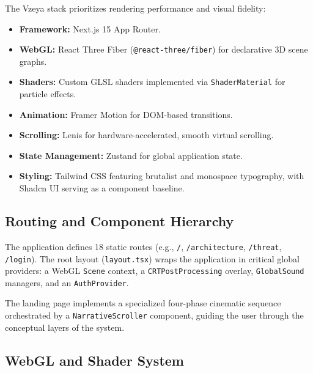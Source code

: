 The Vzeya stack prioritizes rendering performance and visual fidelity:
\begin{itemize}
    \item \textbf{Framework:} Next.js 15 App Router.
    \item \textbf{WebGL:} React Three Fiber (\texttt{@react-three/fiber}) for declarative 3D scene graphs.
    \item \textbf{Shaders:} Custom GLSL shaders implemented via \texttt{ShaderMaterial} for particle effects.
    \item \textbf{Animation:} Framer Motion for DOM-based transitions.
    \item \textbf{Scrolling:} Lenis for hardware-accelerated, smooth virtual scrolling.
    \item \textbf{State Management:} Zustand for global application state.
    \item \textbf{Styling:} Tailwind CSS featuring brutalist and monospace typography, with Shadcn UI serving as a component baseline.
\end{itemize}

\subsection{Routing and Component Hierarchy}
\label{sec:fe-vzeya-routing}

The application defines 18 static routes (e.g., \texttt{/}, \texttt{/architecture}, \texttt{/threat}, \texttt{/login}). The root layout (\texttt{layout.tsx}) wraps the application in critical global providers: a WebGL \texttt{Scene} context, a \texttt{CRTPostProcessing} overlay, \texttt{GlobalSound} managers, and an \texttt{AuthProvider}.

The landing page implements a specialized four-phase cinematic sequence orchestrated by a \texttt{NarrativeScroller} component, guiding the user through the conceptual layers of the system.

\subsection{WebGL and Shader System}
\label{sec:fe-vzeya-webgl}

